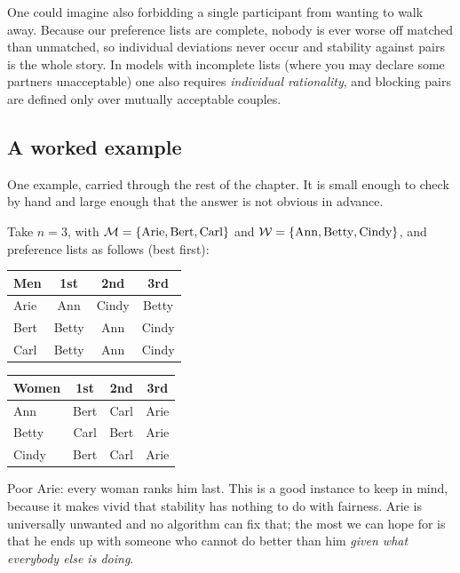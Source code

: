 \begin{remark}
One could imagine also forbidding a single participant from wanting to walk
away. Because our preference lists are complete, nobody is ever worse off
matched than unmatched, so individual deviations never occur and stability
against pairs is the whole story. In models with incomplete lists (where you
may declare some partners unacceptable) one also requires
\emph{individual rationality}, and blocking pairs are defined only over
mutually acceptable couples.
\end{remark}

\subsection{A worked example}\label{sec:sm-example}

One example, carried through the rest of the chapter. It is small enough to
check by hand and large enough that the answer is not obvious in advance.

\begin{example}\label{ex:sm-main}
Take $n=3$, with $\mathcal{M} = \{\text{Arie},\text{Bert},\text{Carl}\}$ and
$\mathcal{W} = \{\text{Ann},\text{Betty},\text{Cindy}\}$, and preference lists as
follows (best first):

\begin{center}
\begin{tabular}{@{}lccc@{}}
\toprule
\textbf{Men} & 1st & 2nd & 3rd \\
\midrule
Arie  & Ann   & Cindy & Betty \\
Bert  & Betty & Ann   & Cindy \\
Carl  & Betty & Ann   & Cindy \\
\bottomrule
\end{tabular}
\hspace{2em}
\begin{tabular}{@{}lccc@{}}
\toprule
\textbf{Women} & 1st & 2nd & 3rd \\
\midrule
Ann   & Bert & Carl & Arie \\
Betty & Carl & Bert & Arie \\
Cindy & Bert & Carl & Arie \\
\bottomrule
\end{tabular}
\end{center}
\end{example}

Poor Arie: every woman ranks him last. This is a good instance to keep in mind,
because it makes vivid that stability has nothing to do with fairness. Arie is
universally unwanted and no algorithm can fix that; the most we can hope for
is that he ends up with someone who cannot do better than him \emph{given
what everybody else is doing}.

